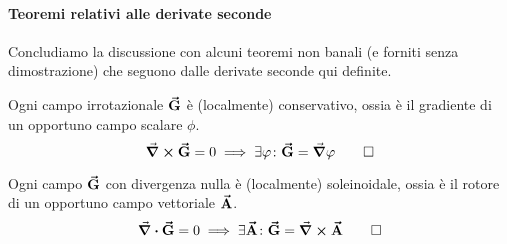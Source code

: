 \paragraph{Teoremi relativi alle derivate seconde}
Concludiamo la discussione con alcuni teoremi non banali (e forniti senza dimostrazione) che seguono dalle derivate seconde qui definite.
\begin{theoremaqed}
	Ogni campo irrotazionale $\vb*{\va{G}}$ è (localmente) conservativo, ossia è il gradiente di un opportuno campo scalare $\phi$.
	\begin{equation*}
		\curl{\vb*{\va{G}}}=0\implies \exists \varphi\colon \vb*{\va{G}}=\grad{\varphi}\qedhere
	\end{equation*}
\end{theoremaqed}
\begin{theoremaqed}
	Ogni campo $\vb*{\va{G}}$ con divergenza nulla è (localmente) soleinoidale, ossia è il rotore di un opportuno campo vettoriale $\vb*{\va{A}}$.
	\begin{equation*}
		\div{\vb*{\va{G}}}=0\implies \exists \vb*{\va{A}}\colon \vb*{\va{G}}=\curl{\vb*{\va{A}}}\qedhere
	\end{equation*}
\end{theoremaqed}
